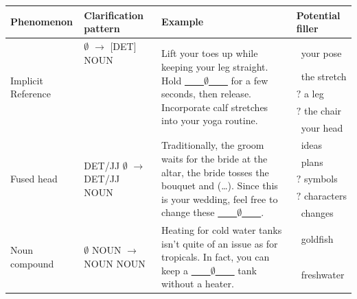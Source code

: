 \documentclass[11pt]{article}
\newcommand{\cmark}{\ding{51}}%
\newcommand{\xmark}{\ding{55}}%
\begin{document}
\begin{table}[!ht]
    \centering
    \begin{tabular}{@{~}llll@{~}}
    \toprule
    Phenomenon & Clarification pattern & Example & Potential filler\\
    \midrule
    \multirow{5}{2cm}{Implicit Reference}  & \multirow{4.5}{5cm}{$\emptyset$ $\rightarrow$ [DET] NOUN} &
    \multirow{5}{5cm}{Lift your toes up while keeping your leg straight. Hold \underline{~~~~$\emptyset$~~~~} for a few seconds, then release. Incorporate calf stretches into your yoga routine.} 
    & \cmark ~your pose \\
    & & & \cmark ~the stretch\\
    & & & $\textbf{?}$ a leg\\
    & & & $\textbf{?}$ the chair\\
    & & & \xmark ~your head\\
    \midrule
    \multirow{5}{2cm}{Fused head}  & \multirow{5}{4.5cm}{DET/JJ $\emptyset$ $\rightarrow$ DET/JJ NOUN} &
    \multirow{5}{5cm}{Traditionally, the groom waits for the bride at the altar, the bride tosses the bouquet and (\ldots). Since this is your wedding, feel free to change these \underline{~~~~$\emptyset$~~~~}.} 
    & \cmark ~ideas \\
    & & & \cmark ~plans\\
    & & & $\textbf{?}$ symbols\\
    & & & $\textbf{?}$ characters\\
    & & & \xmark ~changes\\
    \midrule
    \multirow{5}{2cm}{Noun compound}  & \multirow{5}{4.5cm}{$\emptyset$ NOUN $\rightarrow$ NOUN NOUN} &
    \multirow{5}{5cm}{Heating for cold water tanks isn't quite of an issue as for tropicals. In fact, you can keep a \underline{~~~~$\emptyset$~~~~} tank without a heater.} 
    & \cmark ~goldfish  \\
    & & & \cmark ~freshwater \\

\end{tabular}
\end{table}
\end{document}
